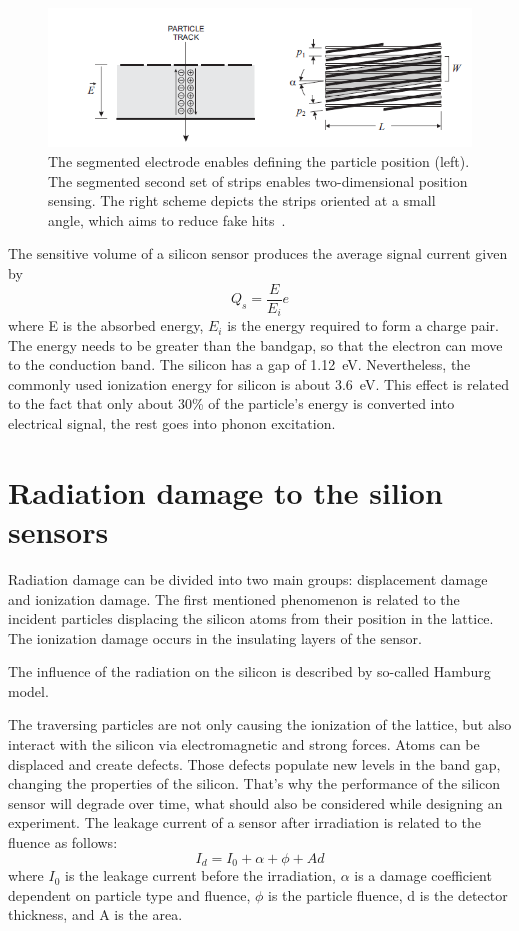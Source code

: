 \begin{figure}[!h]
\centering
\includegraphics[width=1\columnwidth]{Chapter2/images/silicons.png}
\caption{The segmented electrode enables defining the particle position (left). The segmented second set of strips enables two-dimensional position sensing. The right scheme depicts the strips oriented at a small angle, which aims to reduce fake hits~\cite{Spieler}.}
\label{fig_si}
\end{figure}
\newpage


The sensitive volume of a silicon sensor produces the average signal current given by 
\begin{equation}
    Q_{s} = \frac{E}{E_{i}}e
\end{equation}
where E is the absorbed energy, $E_{i}$ is the energy required to form a charge pair. The energy needs to be greater than the bandgap, so that the electron can move to the conduction band. The silicon has a gap of 1.12~eV. Nevertheless, the commonly used ionization energy for silicon is about 3.6~eV. This effect is related to the fact that only about 30\% of the particle's energy is converted into electrical signal, the rest goes into phonon excitation.

\section{Radiation damage to the silion sensors} 

Radiation damage can be divided into two main groups: displacement damage and ionization damage. The first mentioned phenomenon is related to the incident particles displacing the silicon atoms from their position in the lattice. The ionization damage occurs in the insulating layers of the sensor. 

The influence of the radiation on the silicon is described by so-called Hamburg model. 

The traversing particles are not only causing the ionization of the lattice, but also interact with the silicon via electromagnetic and strong forces. Atoms can be displaced and create defects. Those defects populate new levels in the band gap, changing the properties of the silicon. That’s why the performance of the silicon sensor will degrade over time, what should also be considered while designing an experiment. The leakage current of a sensor after irradiation is related to the fluence as follows:
\begin{equation}
    I_{d} = I_{0} + \alpha + \phi + Ad
\end{equation}
where $I_{0}$ is the leakage current before the irradiation, $\alpha$ is a damage coefficient dependent on particle type and fluence, $\phi$ is the particle fluence, d is the detector thickness, and A is the area. 



